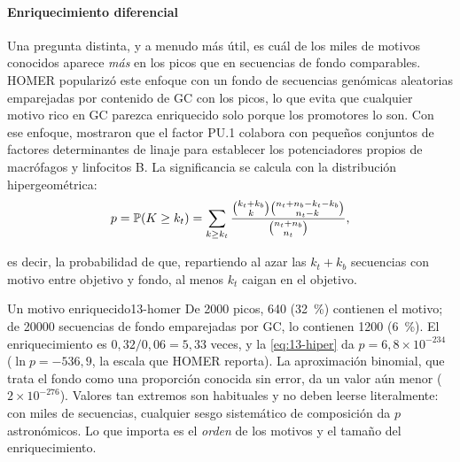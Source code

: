 \paragraph{Enriquecimiento diferencial} Una pregunta distinta, y a menudo más útil, es cuál de los miles de motivos conocidos aparece \emph{más} en los picos que en secuencias de fondo comparables. HOMER \parencite{c13-heinz2010} popularizó este enfoque con un fondo de secuencias genómicas aleatorias emparejadas por contenido de GC con los picos, lo que evita que cualquier motivo rico en GC parezca enriquecido solo porque los promotores lo son. Con ese enfoque, \textcite{c13-heinz2010} mostraron que el factor PU.1 colabora con pequeños conjuntos de factores determinantes de linaje para establecer los potenciadores propios de macrófagos y linfocitos B. La significancia se calcula con la distribución hipergeométrica:
\begin{equation}\label{eq:13-hiper}
p = \mathbb{P}(K\ge k_t) = \sum_{k\ge k_t}\frac{\binom{k_t+k_b}{k}\binom{n_t+n_b-k_t-k_b}{n_t-k}}{\binom{n_t+n_b}{n_t}},
\end{equation}
\begin{simbolos}
\end{simbolos}
\noindent es decir, la probabilidad de que, repartiendo al azar las $k_t+k_b$ secuencias con motivo entre objetivo y fondo, al menos $k_t$ caigan en el objetivo.

\begin{ejemplo}{Un motivo enriquecido}{13-homer}
De \num{2000} picos, 640 (\SI{32}{\percent}) contienen el motivo; de \num{20000} secuencias de fondo emparejadas por GC, lo contienen \num{1200} (\SI{6}{\percent}). El enriquecimiento es $0{,}32/0{,}06=5{,}33$ veces, y la \cref{eq:13-hiper} da $p=6{,}8\times10^{-234}$ ($\ln p=-536{,}9$, la escala que HOMER reporta). La aproximación binomial, que trata el fondo como una proporción conocida sin error, da un valor aún menor ($2\times10^{-276}$). Valores tan extremos son habituales y no deben leerse literalmente: con miles de secuencias, cualquier sesgo sistemático de composición da $p$ astronómicos. Lo que importa es el \emph{orden} de los motivos y el tamaño del enriquecimiento.
\end{ejemplo}

